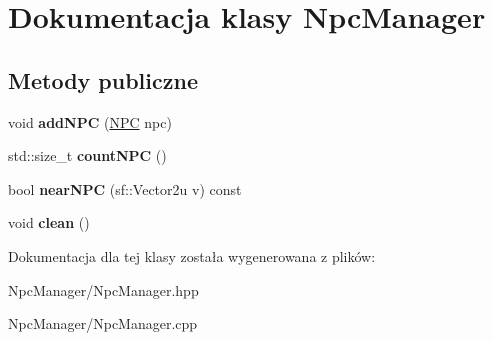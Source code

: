 \hypertarget{class_npc_manager}{\section{Dokumentacja klasy Npc\-Manager}
\label{class_npc_manager}
}
\subsection*{Metody publiczne}
\begin{DoxyCompactItemize}
\item 
\hypertarget{class_npc_manager_ad8b03b02a432e1e6b5a9d30c7fe5012b}{void {\bfseries add\-N\-P\-C} (\hyperlink{struct_n_p_c}{N\-P\-C} npc)}\label{class_npc_manager_ad8b03b02a432e1e6b5a9d30c7fe5012b}

\item 
\hypertarget{class_npc_manager_a96958d77af8589bcec121495b8765e35}{std\-::size\-\_\-t {\bfseries count\-N\-P\-C} ()}\label{class_npc_manager_a96958d77af8589bcec121495b8765e35}

\item 
\hypertarget{class_npc_manager_af8b70fab9fe96eda76ab16e964c19490}{bool {\bfseries near\-N\-P\-C} (sf\-::\-Vector2u v) const }\label{class_npc_manager_af8b70fab9fe96eda76ab16e964c19490}

\item 
\hypertarget{class_npc_manager_a2e4c9ac382614c021c7167c2bf886220}{void {\bfseries clean} ()}\label{class_npc_manager_a2e4c9ac382614c021c7167c2bf886220}

\end{DoxyCompactItemize}


Dokumentacja dla tej klasy została wygenerowana z plików\-:\begin{DoxyCompactItemize}
\item 
Npc\-Manager/Npc\-Manager.\-hpp\item 
Npc\-Manager/Npc\-Manager.\-cpp\end{DoxyCompactItemize}
